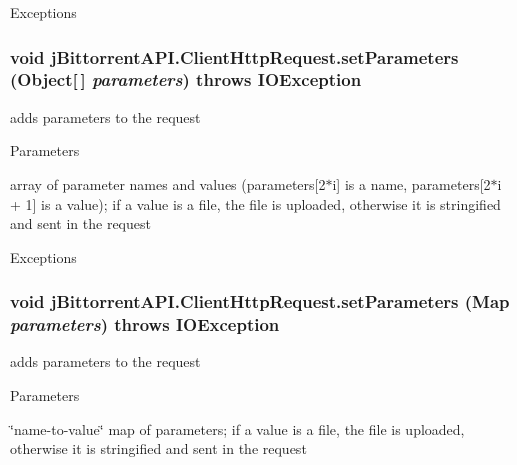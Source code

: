 \begin{DoxyExceptions}{Exceptions}
\item[{\em IOException}]\end{DoxyExceptions}
\hypertarget{classj_bittorrent_a_p_i_1_1_client_http_request_aa17bdf602ebfb5ac2dec1556e84883b6}{
\subsubsection[{setParameters}]{\setlength{\rightskip}{0pt plus 5cm}void jBittorrentAPI.ClientHttpRequest.setParameters (Object\mbox{[}$\,$\mbox{]} {\em parameters})  throws IOException }}
\label{classj_bittorrent_a_p_i_1_1_client_http_request_aa17bdf602ebfb5ac2dec1556e84883b6}
adds parameters to the request 
\begin{DoxyParams}{Parameters}
\item[{\em parameters}]array of parameter names and values (parameters\mbox{[}2$\ast$i\mbox{]} is a name, parameters\mbox{[}2$\ast$i + 1\mbox{]} is a value); if a value is a file, the file is uploaded, otherwise it is stringified and sent in the request \end{DoxyParams}

\begin{DoxyExceptions}{Exceptions}
\item[{\em IOException}]\end{DoxyExceptions}
\hypertarget{classj_bittorrent_a_p_i_1_1_client_http_request_a76c4b629c7b032ec741dfd3d0f00de43}{
\subsubsection[{setParameters}]{\setlength{\rightskip}{0pt plus 5cm}void jBittorrentAPI.ClientHttpRequest.setParameters (Map {\em parameters})  throws IOException }}
\label{classj_bittorrent_a_p_i_1_1_client_http_request_a76c4b629c7b032ec741dfd3d0f00de43}
adds parameters to the request 
\begin{DoxyParams}{Parameters}
\item[{\em parameters}]\char`\"{}name-\/to-\/value\char`\"{} map of parameters; if a value is a file, the file is uploaded, otherwise it is stringified and sent in the request \end{DoxyParams}

